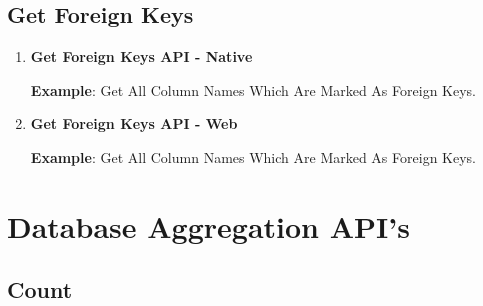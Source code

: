 	\subsection{Get Foreign Keys}

		\begin{enumerate}
	
			\item \small \textbf{Get Foreign Keys API - Native}
				

				\par
				\textbf{Example}: Get All Column Names Which Are Marked As Foreign Keys.
					

			\item \small \textbf{Get Foreign Keys API - Web}
				

				\par
				\textbf{Example}: Get All Column Names Which Are Marked As Foreign Keys.
					
	
		\end{enumerate}



\section{Database Aggregation API's}


	\subsection{Count}

